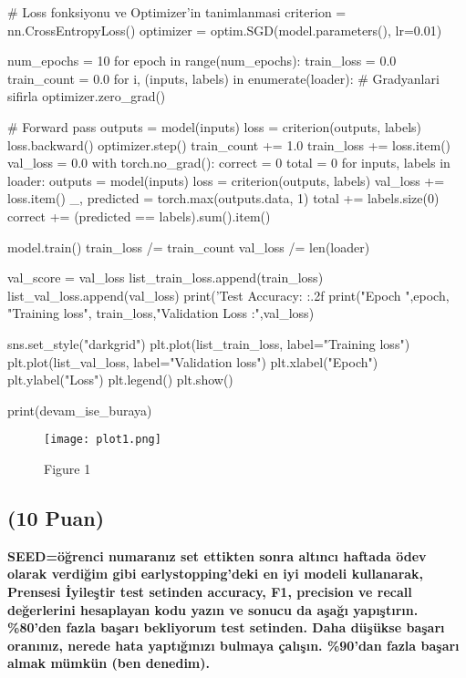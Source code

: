 \documentclass[11pt]{article}
\begin{document}
\begin{python}
# Loss fonksiyonu ve Optimizer'in tanimlanmasi
criterion = nn.CrossEntropyLoss()
optimizer = optim.SGD(model.parameters(), lr=0.01)

num_epochs = 10
for epoch in range(num_epochs):
    train_loss = 0.0
    train_count = 0.0
    for i, (inputs, labels) in enumerate(loader):
        # Gradyanlari sifirla
        optimizer.zero_grad()
        
        # Forward pass
        outputs = model(inputs)
        loss = criterion(outputs, labels)
        loss.backward()
        optimizer.step()
        train_count += 1.0
        train_loss += loss.item()
    val_loss = 0.0
    with torch.no_grad():
        correct = 0
        total = 0
        for inputs, labels in loader:
            outputs = model(inputs)
            loss = criterion(outputs, labels)
            val_loss += loss.item()
            _, predicted = torch.max(outputs.data, 1)
            total += labels.size(0)
            correct += (predicted == labels).sum().item()
        

    model.train()
    train_loss /= train_count
    val_loss /= len(loader)

    val_score = val_loss
    list_train_loss.append(train_loss)
    list_val_loss.append(val_loss)
    print('Test Accuracy: {:.2f} %
    print("Epoch ",epoch, "Training loss", train_loss,"Validation Loss :",val_loss)
    
sns.set_style("darkgrid")
plt.plot(list_train_loss, label="Training loss")
plt.plot(list_val_loss, label="Validation loss")
plt.xlabel("Epoch")
plt.ylabel("Loss")
plt.legend()
plt.show()

print(devam_ise_buraya)
\end{python}


\begin{figure}[ht!]
    \centering
    \texttt{[image: plot1.png]}
    \caption{Figure 1}
    \label{fig:my_pic}
\end{figure}


\subsection{(10 Puan)} \textbf{SEED=öğrenci numaranız set ettikten sonra altıncı haftada ödev olarak verdiğim gibi earlystopping'deki en iyi modeli kullanarak, Prensesi İyileştir test setinden accuracy, F1, precision ve recall değerlerini hesaplayan kodu yazın ve sonucu da aşağı yapıştırın. \%80'den fazla başarı bekliyorum test setinden. Daha düşükse başarı oranınız, nerede hata yaptığınızı bulmaya çalışın. \%90'dan fazla başarı almak mümkün (ben denedim).}
\end{document}
